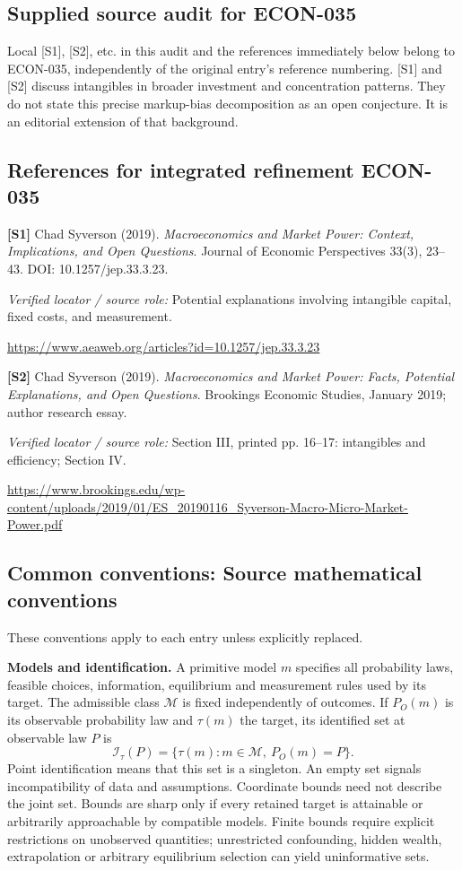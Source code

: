 \documentclass[11pt,a4paper]{article}
\begin{document}
\subsection*{Supplied source audit for ECON-035}
Local [S1], [S2], etc. in this audit and the references immediately below
belong to ECON-035, independently of the original entry's reference numbering.
[S1] and [S2] discuss intangibles in broader investment and concentration patterns. They do not state this precise markup-bias decomposition as an open conjecture. It is an editorial extension of that background.
\subsection*{References for integrated refinement ECON-035}
{\footnotesize\raggedright
\par\noindent\textbf{[S1]} Chad Syverson (2019). \emph{Macroeconomics and Market Power: Context, Implications, and Open Questions}. Journal of Economic Perspectives 33(3), 23–43. DOI: 10.1257/jep.33.3.23.\par \textit{Verified locator / source role:} Potential explanations involving intangible capital, fixed costs, and measurement.\par \url{https://www.aeaweb.org/articles?id=10.1257/jep.33.3.23}\par\smallskip
\par\noindent\textbf{[S2]} Chad Syverson (2019). \emph{Macroeconomics and Market Power: Facts, Potential Explanations, and Open Questions}. Brookings Economic Studies, January 2019; author research essay.\par \textit{Verified locator / source role:} Section III, printed pp. 16–17: intangibles and efficiency; Section IV.\par \url{https://www.brookings.edu/wp-content/uploads/2019/01/ES_20190116_Syverson-Macro-Micro-Market-Power.pdf}\par\smallskip
}

\subsection*{Common conventions: Source mathematical conventions}

These conventions apply to each entry unless explicitly replaced.

\textbf{Models and identification.} A primitive model \(m\) specifies all probability laws, feasible choices, information, equilibrium and measurement rules used by its target. The admissible class \(\mathcal M\) is fixed independently of outcomes. If \(P_O(m)\) is its observable probability law and \(\tau(m)\) the target, its identified set at observable law \(P\) is
\[
 \mathcal I_\tau(P)=\{\tau(m):m\in\mathcal M,\ P_O(m)=P\}.
\]
Point identification means that this set is a singleton. An empty set signals incompatibility of data and assumptions. Coordinate bounds need not describe the joint set. Bounds are sharp only if every retained target is attainable or arbitrarily approachable by compatible models. Finite bounds require explicit restrictions on unobserved quantities; unrestricted confounding, hidden wealth, extrapolation or arbitrary equilibrium selection can yield uninformative sets.
\end{document}
